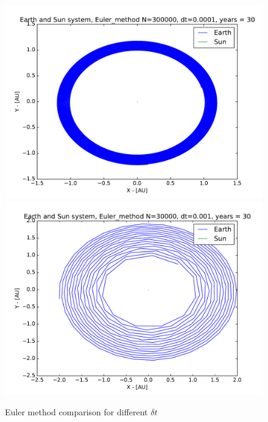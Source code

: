 \documentclass[12pt]{article}
\begin{document}
\begin{figure}[hbtp]
\centering
\includegraphics[width=\linewidth]{Plots/Earth_Sun_Euler_method.pdf}
\includegraphics[width=\linewidth]{Plots/Earth_Sun_Euler_method_larger_dt.pdf} 
\caption{Euler method comparison for different $\delta t$}
\end{figure}
\end{document}
